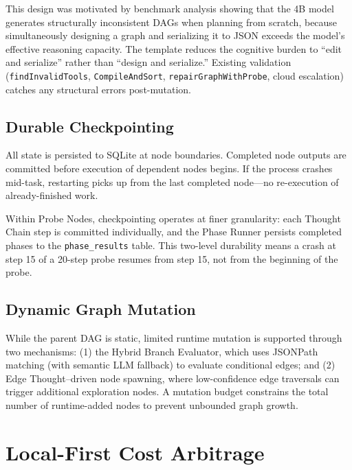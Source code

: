 \documentclass{article}
\begin{document}
This design was motivated by benchmark analysis showing that the 4B model generates structurally inconsistent DAGs when planning from scratch, because simultaneously designing a graph and serializing it to JSON exceeds the model's effective reasoning capacity.
The template reduces the cognitive burden to ``edit and serialize'' rather than ``design and serialize.''
Existing validation (\texttt{findInvalidTools}, \texttt{CompileAndSort}, \texttt{repairGraphWithProbe}, cloud escalation) catches any structural errors post-mutation.

\subsection{Durable Checkpointing}

All state is persisted to SQLite at node boundaries.
Completed node outputs are committed before execution of dependent nodes begins.
If the process crashes mid-task, restarting picks up from the last completed node---no re-execution of already-finished work.

Within Probe Nodes, checkpointing operates at finer granularity: each Thought Chain step is committed individually, and the Phase Runner persists completed phases to the \texttt{phase\_results} table.
This two-level durability means a crash at step 15 of a 20-step probe resumes from step 15, not from the beginning of the probe.

\subsection{Dynamic Graph Mutation}

While the parent DAG is static, limited runtime mutation is supported through two mechanisms:
(1) the Hybrid Branch Evaluator, which uses JSONPath matching (with semantic LLM fallback) to evaluate conditional edges;
and (2) Edge Thought--driven node spawning, where low-confidence edge traversals can trigger additional exploration nodes.
A mutation budget constrains the total number of runtime-added nodes to prevent unbounded graph growth.

\section{Local-First Cost Arbitrage}
\label{sec:cost_arbitrage}
\end{document}
